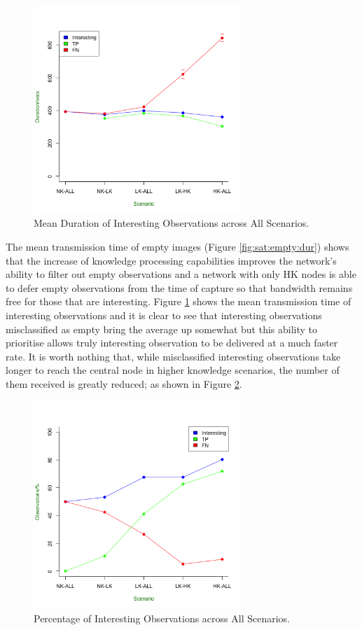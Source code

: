 	\begin{figure}[h]
	\centering
	\includegraphics[width=0.70\textwidth]{Chap7/figures/saturated/int_dur}
	\caption{Mean Duration of Interesting Observations across All Scenarios.}
	\label{fig:sat:int:dur}
	\end{figure}

The mean transmission time of empty images (Figure \ref{fig:sat:empty:dur}) shows that the increase of knowledge processing capabilities improves the network's ability to filter out empty observations and a network with only HK nodes is able to defer empty observations from the time of capture so that bandwidth remains free for those that are interesting. Figure \ref{fig:sat:int:dur} shows the mean transmission time of interesting observations and it is clear to see that interesting observations misclassified as empty bring the average up somewhat but this ability to prioritise allows truly interesting observation to be delivered at a much faster rate. It is worth nothing that, while misclassified interesting observations take longer to reach the central node in higher knowledge scenarios, the number of them received is greatly reduced; as shown in Figure \ref{fig:sat:int:percent}.

	\begin{figure}[h]
	\centering
	\includegraphics[width=0.70\textwidth]{Chap7/figures/saturated/int_percent}
	\caption{Percentage of Interesting Observations across All Scenarios.}
	\label{fig:sat:int:percent}
	\end{figure}

